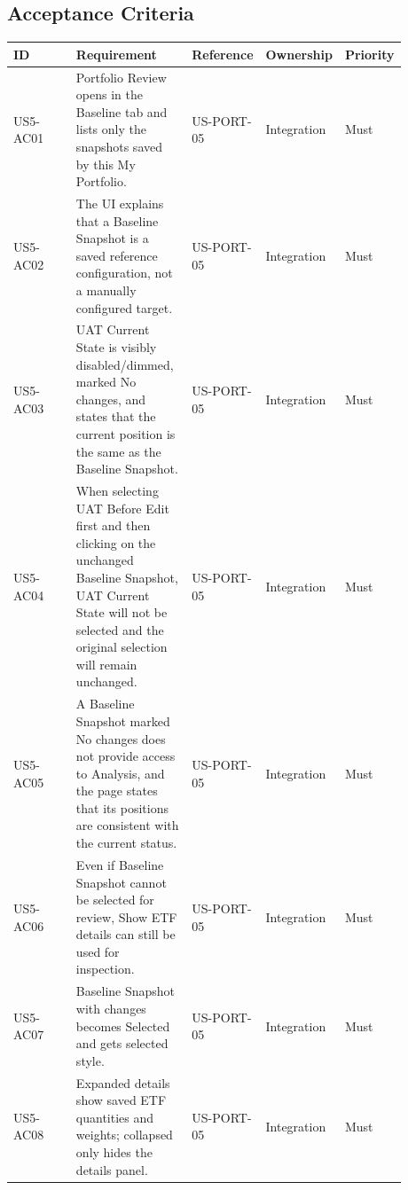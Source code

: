 \subsection{Acceptance Criteria}
\begingroup
\small
\begin{longtable}{L{0.18\linewidth}L{0.30\linewidth}L{0.18\linewidth}L{0.12\linewidth}L{0.10\linewidth}}
\toprule
\textbf{ID} & \textbf{Requirement} & \textbf{Reference} & \textbf{Ownership} & \textbf{Priority} \\
\midrule
US5-AC01 & Portfolio Review opens in the Baseline tab and lists only the snapshots saved by this My Portfolio. & US-PORT-05 & Integration & Must \\
US5-AC02 & The UI explains that a Baseline Snapshot is a saved reference configuration, not a manually configured target. & US-PORT-05 & Integration & Must \\
US5-AC03 & UAT Current State is visibly disabled/\allowbreak{}dimmed, marked No changes, and states that the current position is the same as the Baseline Snapshot. & US-PORT-05 & Integration & Must \\
US5-AC04 & When selecting UAT Before Edit first and then clicking on the unchanged Baseline Snapshot, UAT Current State will not be selected and the original selection will remain unchanged. & US-PORT-05 & Integration & Must \\
US5-AC05 & A Baseline Snapshot marked No changes does not provide access to Analysis, and the page states that its positions are consistent with the current status. & US-PORT-05 & Integration & Must \\
US5-AC06 & Even if Baseline Snapshot cannot be selected for review, Show ETF details can still be used for inspection. & US-PORT-05 & Integration & Must \\
US5-AC07 & Baseline Snapshot with changes becomes Selected and gets selected style. & US-PORT-05 & Integration & Must \\
US5-AC08 & Expanded details show saved ETF quantities and weights; collapsed only hides the details panel. & US-PORT-05 & Integration & Must \\

\end{longtable}
